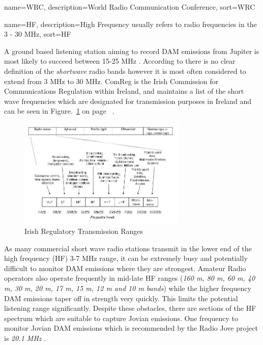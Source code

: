 %
{
  name={WRC},
  description={World Radio Communication Conference},
  sort=WRC
}
%

%
{
  name={HF},
  description={High Frequency usually refers to radio frequencies in the 3 - 30 MHz},
  sort=HF
}
%

A ground based listening station aiming to record \gls{DAM} emissions from Jupiter is most likely to succeed between 15-25 MHz \citep{wilkinson94}. According to \cite{arrl-00} there is no clear definition of the \textit{shortwave} radio bands however it is most often considered to extend from 3 MHz to 30 MHz. ComReg is the Irish Commission for Communications Regulation within Ireland, and maintains a list of the short wave frequencies which are designated for transmission purposes in Ireland and can be seen in Figure.~\ref{fig:irish_electromagnetic_transmission_ranges} on page~\pageref{fig:irish_electromagnetic_transmission_ranges} \citep{comreg14}.

%
\begin{figure}[here]
\centering
\includegraphics[width=8cm]{images/06}
\caption{Irish Regulatory Transmission Ranges \citep{comreg14}}
\label{fig:irish_electromagnetic_transmission_ranges}
\end{figure}
%

As many commercial short wave radio stations transmit in the lower end of the high frequency (\gls{HF}) 3-7 MHz range, it can be extremely busy and potentially difficult to monitor \gls{DAM} emissions where they are strongest. Amateur Radio operators also operate frequently in mid-late \gls{HF} ranges (\textit{160 m, 80 m, 60 m, 40 m, 30 m, 20 m, 17 m, 15 m, 12 m and 10 m bands}) while the higher frequency \gls{DAM} emissions taper off in strength very quickly. This limits the potential listening range significantly. Despite these obstacles, there are sections of the \gls{HF} spectrum which are suitable to capture Jovian emissions. One frequency to monitor Jovian \gls{DAM} emissions which is recommended by the Radio Jove project is \textit{20.1 MHz} \citep{nasa12}. 

